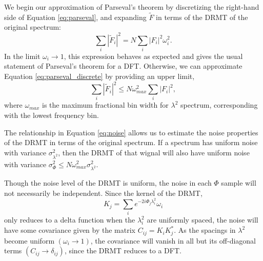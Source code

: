 We begin our approximation of Parseval's theorem by discretizing the right-hand side of Equation
\ref{eq:parseval}, and expanding $\widetilde{F}$ in terms of the DRMT of the original spectrum:
\begin{equation}
  \sum_i|\widetilde{F}_i|^2 = N \sum_i \left|F_i\right|^2\omega_i^2.
  \label{eq:parseval_discrete}
\end{equation}
In the limit $\omega_i\to1$, this expression behaves as expected and gives the usual statement of
Parseval's theorem for a DFT. Otherwise, we can approximate Equation \ref{eq:parseval_discrete} by
providing an upper limit,
\begin{equation}
  \sum_i|\widetilde{F}_i|^2 \le N\omega_{max}^2\sum_i\left|F_i\right|^2,
  \label{eq:noise}
\end{equation}
where $\omega_{max}$ is the maximum fractional bin width for $\lambda^2$ spectrum, corresponding
with the lowest frequency bin.

The relationship in Equation \ref{eq:noise} allows us to estimate the noise properties of the DRMT
in terms of the original spectrum. If a spectrum has uniform noise with variance
$\sigma^2_{\lambda^2}$, then the DRMT of that wignal will also have uniform noise with variance
$\sigma^2_\Phi \le N\omega_{max}^2\sigma_{\lambda^2}^2$.

Though the noise level of the DRMT is uniform, the noise in each $\Phi$ sample will not necessarily
be independent. Since the kernel of the DRMT, 
\begin{equation}
  K_j = \sum_i e^{-2i\Phi_j\lambda_i^2}\omega_i
  \label{eq:kernel}
\end{equation}
only reduces to a delta function when the $\lambda_i^2$ are uniformly spaced, the noise will have
some covariance given by the matrix $C_{ij} = K_iK_j^*$. As the spacings in $\lambda^2$ become
uniform $(\omega_i\to1)$, the covariance will vanish in all but its off-diagonal terms
$(C_{ij}\to\delta_{ij})$, since the DRMT reduces to a DFT.
